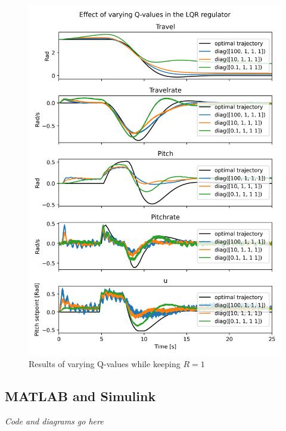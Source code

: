 \documentclass[../main.tex]{subfiles}
\begin{document}
\begin{figure}[h]
	\includegraphics[width=\linewidth]{figures/LAB3_Q_variations.png}
	\caption{Results of varying Q-values while keeping $R=1$}
	\label{fig:LAB3_Q_variations}
\end{figure}
\clearpage

\subsection{MATLAB and Simulink}
\textit{Code and diagrams go here}
\end{document}
